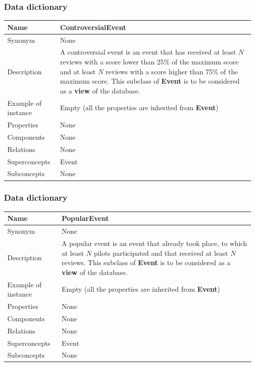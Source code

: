 \documentclass{beamer}
\begin{document}
\begin{frame}
    \frametitle{Data dictionary}
    \begin{table}
    \tiny
    \begin{tabular}{|p{2cm}|p{6cm}|}
    \hline
    Name & \textbf{ControversialEvent} \\
    \hline
    Synonym & None \\
    \hline
    Description & A controversial event is an event that has received at least $N$ reviews
    with a score lower than 25\% of the maximum score and at least $N$ reviews 
    with a score higher than 75\% of the maximum score.\newline
    This subclass of \textbf{Event} is to be considered as a \textbf{view} of the database. \\
    \hline
    Example of instance & Empty (all the properties are inherited from \textbf{Event}) \\
    \hline
    Properties & None \\
    \hline
    Components & None \\
    \hline
    Relations & None \\
    \hline
    Superconcepts & Event \\
    \hline
    Subconcepts & None \\
    \hline
    \end{tabular}
    \end{table}
\end{frame}


\begin{frame}
    \frametitle{Data dictionary}
    \begin{table}
    \tiny
    \begin{tabular}{|p{2cm}|p{6cm}|}
    \hline
    Name & \textbf{PopularEvent} \\
    \hline
    Synonym & None \\
    \hline
    Description & A popular event is an event that already took place, 
    to which at least $N$ pilots participated 
    and that received at least $N$ reviews. \newline
    This subclass of \textbf{Event} is to be considered as a \textbf{view} of the database. \\
    \hline
    Example of instance & Empty (all the properties are inherited from \textbf{Event}) \\
    \hline
    Properties & None \\
    \hline
    Components & None \\
    \hline
    Relations & None \\
    \hline
    Superconcepts & Event \\
    \hline
    Subconcepts & None \\
    \hline
    \end{tabular}
    \end{table}
\end{frame}
\end{document}

